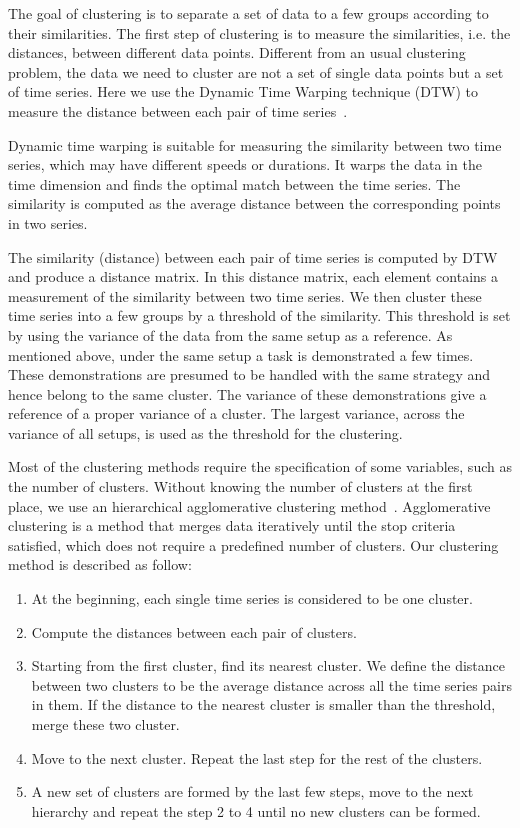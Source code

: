 The goal of clustering is to separate a set of data to a few groups according to their similarities. The first step of clustering is to measure the similarities, i.e. the distances, between different data points. Different from an usual clustering problem, the data we need to cluster are not a set of single data points but a set of time series. Here we use the Dynamic Time Warping technique (DTW) to measure the distance between each pair of time series~\cite{berndt1994using}.

Dynamic time warping is suitable for measuring the similarity between two time series, which may have different speeds or durations. It warps the data in the time dimension and finds the optimal match between the time series. The similarity is computed as the average distance between the corresponding points in two series.

The similarity (distance) between each pair of time series is computed by DTW and produce a distance matrix. In this distance matrix, each element contains a measurement of the similarity between two time series. We then cluster these time series into a few groups by a threshold of the similarity. This threshold is set by using the variance of the data from the same setup as a reference. As mentioned above, under the same setup a task is demonstrated a few times. These demonstrations are presumed to be handled with the same strategy and hence belong to the same cluster. The variance of these demonstrations give a reference of a proper variance of a cluster. The largest variance, across the variance of all setups, is used as the threshold for the clustering.

Most of the clustering methods require the specification of some variables, such as the number of clusters. Without knowing the number of clusters at the first place, we use an hierarchical agglomerative clustering method~\cite{willett1988recent}. Agglomerative clustering is a method that merges data iteratively until the stop criteria satisfied, which does not require a predefined number of clusters. Our clustering method is described as follow:

\begin{enumerate}
\item At the beginning, each single time series is considered to be one cluster.
\item Compute the distances between each pair of clusters.
\item Starting from the first cluster, find its nearest cluster. We define the distance between two clusters to be the average distance across all the time series pairs in them. If the distance to the nearest cluster is smaller than the threshold, merge these two cluster.
\item Move to the next cluster. Repeat the last step for the rest of the clusters.
\item A new set of clusters are formed by the last few steps, move to the next hierarchy and repeat the step 2 to 4 until no new clusters can be formed.
\end{enumerate}

